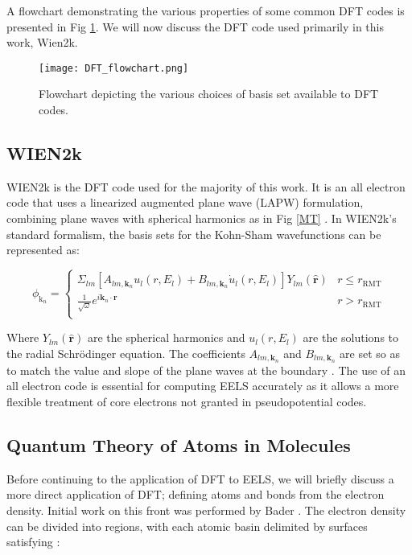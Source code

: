  A flowchart demonstrating the various properties of some common DFT codes is presented in Fig \ref{dft-flowchart}.  We will now discuss the DFT code used primarily in this work, Wien2k.

\begin{figure}
	\centering
	\texttt{[image: DFT\_flowchart.png]}
	\caption{Flowchart depicting the various choices of basis set available to DFT codes.}
	\label{dft-flowchart}
\end{figure}


\subsection{WIEN2k}
WIEN2k is the DFT code used for the majority of this work.  It is an all electron code that uses a linearized augmented plane wave (LAPW) formulation, combining plane waves with spherical harmonics as in Fig \ref{MT} \cite{wien2k}.   In WIEN2k's standard formalism, the basis sets for the Kohn-Sham wavefunctions can be represented as: 

\begin{equation}
	\phi_{\mathrm{k}_n} = 
	\begin{cases}
	\Sigma_{lm} [A_{lm,\textbf{k}_n}u_l(r,E_l) + B_{lm,\textbf{k}_n}\dot{u}_l(r,E_l)]Y_{lm}(\hat{\textbf{r}}) & r \leq r_{\mathrm{RMT}} \\
	\frac{1}{\sqrt{\omega}}e^{i\textbf{k}_n \cdot \textbf{r}} & r> r_{\mathrm{RMT}} \\
	\end{cases}
\end{equation}

Where $Y_{lm}(\hat{\textbf{r}})$ are the spherical harmonics and $u_l(r,E_l)$ are the solutions to the radial Schr\"odinger equation.  The coefficients $A_{lm,\textbf{k}_n}$ and $B_{lm,\textbf{k}_n}$ are set so as to match the value and slope of the plane waves at the boundary \cite{wien2k}.  The use of an all electron code is essential for computing EELS accurately as it allows a more flexible treatment of core electrons not granted in pseudopotential codes. 
 


\subsection{Quantum Theory of Atoms in Molecules} \label{bader-theory}
Before continuing to the application of DFT to EELS, we will briefly discuss a more direct application of DFT; defining atoms and bonds from the electron density. Initial work on this front was performed by Bader \cite{bader}. The electron density can be divided into regions, with each atomic basin  delimited by surfaces satisfying \cite{bader_quantum_1991}: 


